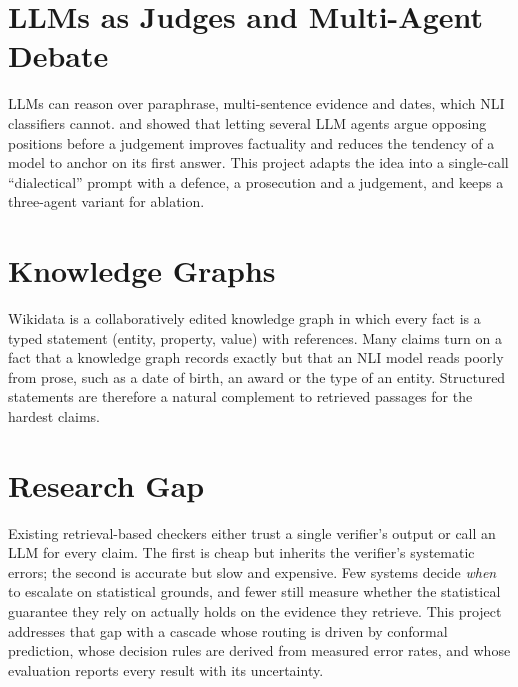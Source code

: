 \section{LLMs as Judges and Multi-Agent Debate}

LLMs can reason over paraphrase, multi-sentence evidence and dates, which NLI classifiers cannot. \citet{du2023improving} and \citet{liang2023encouraging} showed that letting several LLM agents argue opposing positions before a judgement improves factuality and reduces the tendency of a model to anchor on its first answer. This project adapts the idea into a single-call ``dialectical'' prompt with a defence, a prosecution and a judgement, and keeps a three-agent variant for ablation.

\section{Knowledge Graphs}

Wikidata is a collaboratively edited knowledge graph in which every fact is a typed statement (entity, property, value) with references. Many claims turn on a fact that a knowledge graph records exactly but that an NLI model reads poorly from prose, such as a date of birth, an award or the type of an entity. Structured statements are therefore a natural complement to retrieved passages for the hardest claims.

\section{Research Gap}

Existing retrieval-based checkers either trust a single verifier's output or call an LLM for every claim. The first is cheap but inherits the verifier's systematic errors; the second is accurate but slow and expensive. Few systems decide \emph{when} to escalate on statistical grounds, and fewer still measure whether the statistical guarantee they rely on actually holds on the evidence they retrieve. This project addresses that gap with a cascade whose routing is driven by conformal prediction, whose decision rules are derived from measured error rates, and whose evaluation reports every result with its uncertainty.
